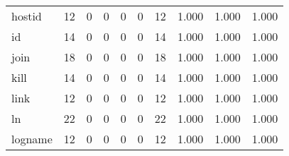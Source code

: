 \begin{longtable}{lp{2.0cm}p{2.0cm}p{2.0cm}p{2.0cm}p{2.0cm}p{2.0cm}p{2.0cm}p{2.0cm}p{2.0cm}}
hostid    &                     12 &                                             0 &                                            0 &                                           0 &                                            0 &                                         12 &                                1.000 &                                  1.000 &                                1.000 \\
id        &                     14 &                                             0 &                                            0 &                                           0 &                                            0 &                                         14 &                                1.000 &                                  1.000 &                                1.000 \\
join      &                     18 &                                             0 &                                            0 &                                           0 &                                            0 &                                         18 &                                1.000 &                                  1.000 &                                1.000 \\
kill      &                     14 &                                             0 &                                            0 &                                           0 &                                            0 &                                         14 &                                1.000 &                                  1.000 &                                1.000 \\
link      &                     12 &                                             0 &                                            0 &                                           0 &                                            0 &                                         12 &                                1.000 &                                  1.000 &                                1.000 \\
ln        &                     22 &                                             0 &                                            0 &                                           0 &                                            0 &                                         22 &                                1.000 &                                  1.000 &                                1.000 \\
logname   &                     12 &                                             0 &                                            0 &                                           0 &                                            0 &                                         12 &                                1.000 &                                  1.000 &                                1.000 \\

\end{longtable}

